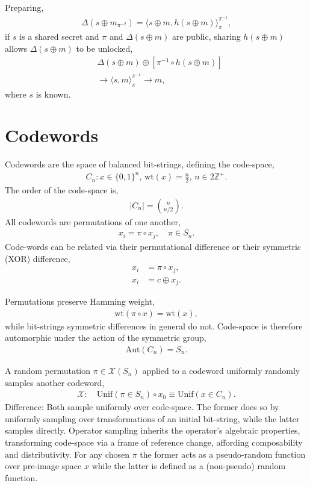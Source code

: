 \documentclass[twocolumn, aps, amsmath, amssymb, nofootinbib, superscriptaddress, longbibliography, doublefloatfix, table-of-contents, eqsecnum, rmp]{revtex4-2}
\def\symbraid#1{\langle#1\rangle_{\pi}^{\pi^{-1}}}
\begin{document}
Preparing,
\begin{align}
	\Delta(s\oplus m_{\pi^{-2}}) = \symbraid{s\oplus m, h(s\oplus m)},
\end{align}
if $s$ is a shared secret and $\pi$ and $\Delta(s\oplus m)$ are public, sharing $h(s\oplus m)$ allows $\Delta(s\oplus m)$ to be unlocked,
\begin{align}
	&\Delta(s\oplus m) \oplus [\pi^{-1}\circ h(s\oplus m)]\nonumber\\
	&\to \symbraid{s,m} \to m,
\end{align}
where $s$ is known.

\section{Codewords}

Codewords are the space of balanced bit-strings, defining the code-space,
\begin{align}
	C_n: x\in\{0,1\}^n,\, \mathrm{wt}(x)=\frac{n}{2},\, n\in 2\mathbb{Z}^+.
\end{align}
The order of the code-space is,
\begin{align}
	|C_n| = \binom{n}{n/2}.
\end{align}
All codewords are permutations of one another,
\begin{align}
	x_i = \pi \circ x_j,\quad \pi\in S_n.
\end{align}
Code-words can be related via their permutational difference or their symmetric (XOR) difference,
\begin{align}
	x_i &= \pi \circ x_j,\nonumber\\
	x_i &= c \oplus x_j.
\end{align}

Permutations preserve Hamming weight,
\begin{align}
	\mathrm{wt}(\pi\circ x) = \mathrm{wt}(x),
\end{align}
while bit-strings symmetric differences in general do not. Code-space is therefore automorphic under the action of the symmetric group,
\begin{align}
	\mathrm{Aut}(C_n) = S_n.
\end{align}


A random permutation $\pi\in\mathcal{X}(S_n)$ applied to a codeword uniformly randomly samples another codeword,
\begin{align}
	\mathcal{X}:\quad \mathrm{Unif}(\pi\in S_n) \circ x_0 \equiv \mathrm{Unif}(x\in C_n).
\end{align}
Difference: Both sample uniformly over code-space. The former does so by uniformly sampling over transformations of an initial bit-string, while the latter samples directly. Operator sampling inherits the operator's algebraic properties, transforming code-space via a frame of reference change, affording composability and distributivity. For any chosen $\pi$ the former acts as a pseudo-random function over pre-image space $x$ while the latter is defined as a (non-pseudo) random function.
\end{document}
